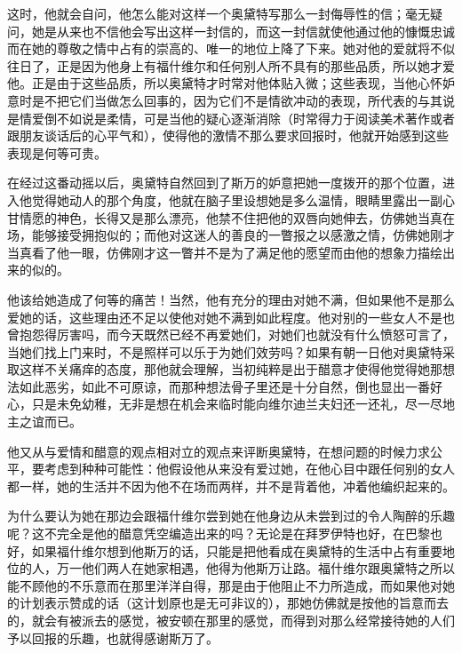 \par 这时，他就会自问，他怎么能对这样一个奥黛特写那么一封侮辱性的信；毫无疑问，她是从来也不信他会写出这样一封信的，而这一封信就使他通过他的慷慨忠诚而在她的尊敬之情中占有的崇高的、唯一的地位上降了下来。她对他的爱就将不似往日了，正是因为他身上有福什维尔和任何别人所不具有的那些品质，所以她才爱他。正是由于这些品质，所以奥黛特才时常对他体贴入微；这些表现，当他心怀妒意时是不把它们当做怎么回事的，因为它们不是情欲冲动的表现，所代表的与其说是情爱倒不如说是柔情，可是当他的疑心逐渐消除（时常得力于阅读美术著作或者跟朋友谈话后的心平气和），使得他的激情不那么要求回报时，他就开始感到这些表现是何等可贵。
\par 在经过这番动摇以后，奥黛特自然回到了斯万的妒意把她一度拨开的那个位置，进入他觉得她动人的那个角度，他就在脑子里设想她是多么温情，眼睛里露出一副心甘情愿的神色，长得又是那么漂亮，他禁不住把他的双唇向她伸去，仿佛她当真在场，能够接受拥抱似的；而他对这迷人的善良的一瞥报之以感激之情，仿佛她刚才当真看了他一眼，仿佛刚才这一瞥并不是为了满足他的愿望而由他的想象力描绘出来的似的。
\par 他该给她造成了何等的痛苦！当然，他有充分的理由对她不满，但如果他不是那么爱她的话，这些理由还不足以使他对她不满到如此程度。他对别的一些女人不是也曾抱怨得厉害吗，而今天既然已经不再爱她们，对她们也就没有什么愤怒可言了，当她们找上门来时，不是照样可以乐于为她们效劳吗？如果有朝一日他对奥黛特采取这样不关痛痒的态度，那他就会理解，当初纯粹是出于醋意才使得他觉得她那想法如此恶劣，如此不可原谅，而那种想法骨子里还是十分自然，倒也显出一番好心，只是未免幼稚，无非是想在机会来临时能向维尔迪兰夫妇还一还礼，尽一尽地主之谊而已。
\par 他又从与爱情和醋意的观点相对立的观点来评断奥黛特，在想问题的时候力求公平，要考虑到种种可能性：他假设他从来没有爱过她，在他心目中跟任何别的女人都一样，她的生活并不因为他不在场而两样，并不是背着他，冲着他编织起来的。
\par 为什么要认为她在那边会跟福什维尔尝到她在他身边从未尝到过的令人陶醉的乐趣呢？这不完全是他的醋意凭空编造出来的吗？无论是在拜罗伊特也好，在巴黎也好，如果福什维尔想到他斯万的话，只能是把他看成在奥黛特的生活中占有重要地位的人，万一他们两人在她家相遇，他得为他斯万让路。福什维尔跟奥黛特之所以能不顾他的不乐意而在那里洋洋自得，那是由于他阻止不力所造成，而如果他对她的计划表示赞成的话（这计划原也是无可非议的），那她仿佛就是按他的旨意而去的，就会有被派去的感觉，被安顿在那里的感觉，而得到对那么经常接待她的人们予以回报的乐趣，也就得感谢斯万了。

